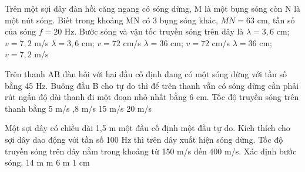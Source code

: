 \begin{ex}%
Trên một sợi dây đàn hồi căng ngang có sóng dừng, M là một bụng sóng còn N là một nút sóng. Biết trong khoảng MN có 3 bụng sóng khác, $MN=63$ cm, tần số của sóng $f=20$ Hz. Bước sóng và vận tốc truyền sóng trên dây là
\choice
{$\lambda =3,6$ cm; $v=7,2$ m/s}
{$\lambda =3,6$ cm; $v=72$ cm/s}
{$\lambda =36$ cm; $v=72$ cm/s}
{\True $\lambda =36$ cm; $v=7,2$ m/s}
\end{ex} 
\begin{ex}%
Trên thanh AB đàn hồi với hai đầu cố định đang có một sóng dừng với tần số bằng 45 Hz. Buông đầu B cho tự do thì để trên thanh vẫn có sóng dừng cần phải rút ngắn độ dài thanh đi một đoạn nhỏ nhất bằng 6 cm. Tốc độ truyền sóng trên thanh bằng
\choice
{5 m/s}
{,8 m/s}
{15 m/s}
{20 m/s}
\end{ex} 
\begin{ex}%
Một sợi dây có chiều dài 1,5 m một đầu cố định một đầu tự do. Kích thích cho sợi dây dao động với tần số 100 Hz thì trên dây xuất hiện sóng dừng. Tốc độ truyền sóng trên dây nằm trong khoảng từ 150 m/s đến 400 m/s. Xác định bước sóng.
\choice
{14 m}
{ m}
{6 m}
{1 cm}
\end{ex} 
